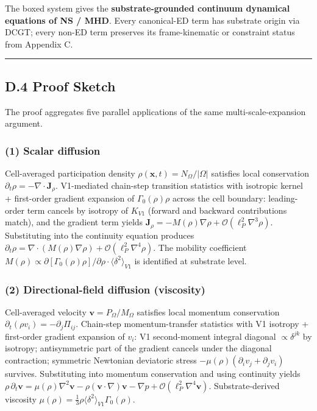\documentclass[
]{article}
\begin{document}
The boxed system gives the \textbf{substrate-grounded continuum
dynamical equations of NS / MHD}. Every canonical-ED term has substrate
origin via DCGT; every non-ED term preserves its frame-kinematic or
constraint status from Appendix C.

\begin{center}\rule{0.5\linewidth}{0.5pt}\end{center}

\subsection{D.4 Proof Sketch}\label{d.4-proof-sketch}

The proof aggregates five parallel applications of the same
multi-scale-expansion argument.

\subsubsection{(1) Scalar diffusion}\label{scalar-diffusion}

Cell-averaged participation density
\(\rho(\mathbf{x},t) = N_\Omega/|\Omega|\) satisfies local conservation
\(\partial_t\rho = -\nabla\cdot\mathbf{J}_\rho\). V1-mediated chain-step
transition statistics with isotropic kernel + first-order gradient
expansion of \(\Gamma_0(\rho)\rho\) across the cell boundary:
leading-order term cancels by isotropy of \(K_{V1}\) (forward and
backward contributions match), and the gradient term yields
\(\mathbf{J}_\rho = -M(\rho)\nabla\rho + \mathcal{O}(\ell_P^2\nabla^3\rho)\).
Substituting into the continuity equation produces
\(\partial_t\rho = \nabla\cdot(M(\rho)\nabla\rho) + \mathcal{O}(\ell_P^2\nabla^4\rho)\).
The mobility coefficient
\(M(\rho) \propto \partial[\Gamma_0(\rho)\rho]/\partial\rho \cdot \bigl\langle\delta^2\bigr\rangle_{V1}\)
is identified at substrate level.

\subsubsection{(2) Directional-field diffusion
(viscosity)}\label{directional-field-diffusion-viscosity}

Cell-averaged velocity \(\mathbf{v} = P_\Omega/M_\Omega\) satisfies
local momentum conservation
\(\partial_t(\rho v_i) = -\partial_j\Pi_{ij}\). Chain-step
momentum-transfer statistics with V1 isotropy + first-order gradient
expansion of \(v_i\): V1 second-moment integral diagonal
\(\propto\delta^{jk}\) by isotropy; antisymmetric part of the gradient
cancels under the diagonal contraction; symmetric Newtonian deviatoric
stress \(-\mu(\rho)(\partial_i v_j + \partial_j v_i)\) survives.
Substituting into momentum conservation and using continuity yields
\(\rho\,\partial_t\mathbf{v} = \mu(\rho)\nabla^2\mathbf{v} - \rho(\mathbf{v}\cdot\nabla)\mathbf{v} - \nabla p + \mathcal{O}(\ell_P^2\nabla^4\mathbf{v})\).
Substrate-derived viscosity
\(\mu(\rho) = \tfrac{1}{3}\rho\bigl\langle\delta^2\bigr\rangle_{V1}\Gamma_0(\rho)\).
\end{document}
